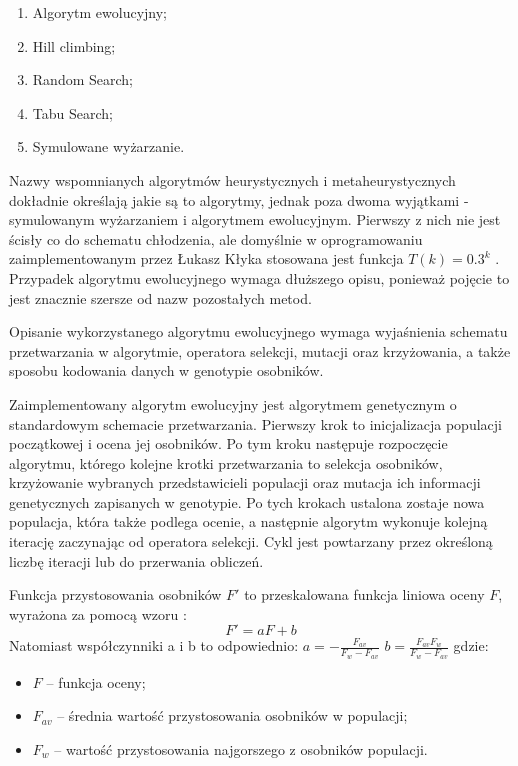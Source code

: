 \documentclass[11pt,a4paper]{llncs}
\begin{document}
\begin{enumerate}
	\item Algorytm ewolucyjny;
	\item Hill climbing;
	\item Random Search;
	\item Tabu Search; 
	\item Symulowane wyżarzanie.
\end{enumerate}



Nazwy wspomnianych algorytmów heurystycznych i metaheurystycznych dokładnie określają jakie są to algorytmy, jednak poza dwoma wyjątkami - symulowanym wyżarzaniem i algorytmem ewolucyjnym.
Pierwszy z nich nie jest ścisły co do schematu chłodzenia, ale domyślnie w oprogramowaniu zaimplementowanym przez Łukasz Kłyka stosowana jest funkcja \( T(k) = 0.3^{k} \) \cite[str. 36]{klyk}.
Przypadek algorytmu ewolucyjnego wymaga dłuższego opisu, ponieważ pojęcie to jest znacznie szersze od nazw pozostałych metod.



Opisanie wykorzystanego algorytmu ewolucyjnego wymaga wyjaśnienia schematu przetwarzania w algorytmie, operatora selekcji, mutacji oraz krzyżowania, a także sposobu kodowania danych w genotypie osobników.



Zaimplementowany algorytm ewolucyjny jest algorytmem genetycznym o standardowym schemacie przetwarzania.
Pierwszy krok to inicjalizacja populacji początkowej i ocena jej osobników.
Po tym kroku następuje rozpoczęcie algorytmu, którego kolejne krotki przetwarzania to selekcja osobników, krzyżowanie wybranych przedstawicieli populacji oraz mutacja ich informacji genetycznych zapisanych w genotypie.
Po tych krokach ustalona zostaje nowa populacja, która także podlega ocenie, a następnie algorytm wykonuje kolejną iterację zaczynając od operatora selekcji.
Cykl jest powtarzany przez określoną liczbę iteracji lub do przerwania obliczeń.



Funkcja przystosowania osobników \( F' \) to przeskalowana funkcja liniowa oceny \( F \), wyrażona za pomocą wzoru \cite[str. 28]{klyk}:
$$ F' = aF + b $$
Natomiast współczynniki a i b to odpowiednio:
\( a = - \frac{F_{av}}{F_{w} - F_{av}} \)
\( b = \frac{F_{av}F_{w}}{F_{w} - F_{av}} \)
gdzie:
\begin{itemize}
	\item \( F \) -- funkcja oceny;
	\item \( F_{av} \) -- średnia wartość przystosowania osobników w populacji;
	\item \( F_{w} \) -- wartość przystosowania najgorszego z osobników populacji.
\end{itemize}
\end{document}

